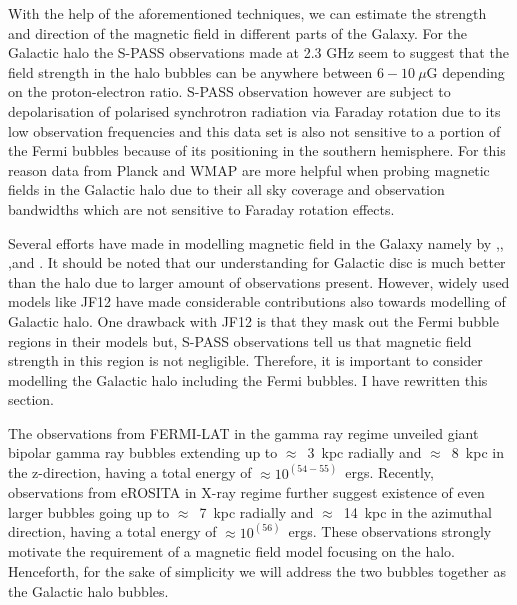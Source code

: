 \documentclass[12pt, a4 paper]{article}
\newcommand{\Arjen}[1]{{\color{brown}#1}}
\newcommand{\Vasu}[1]{{\color{purple}#1}}
\begin{document}
With the help of the aforementioned techniques, we can estimate the strength and direction of the magnetic field in different parts of the Galaxy. 
For the Galactic halo the S-PASS observations made at 2.3 GHz seem to suggest that the field strength in the halo bubbles can be anywhere between $6-10~\mu $G depending on the proton-electron ratio. S-PASS observation however are subject to depolarisation of polarised synchrotron radiation via Faraday rotation due to its low observation frequencies and this data set is also not sensitive to a portion of the Fermi bubbles because of its positioning in the southern hemisphere. For this reason data from Planck and WMAP are more helpful when probing magnetic fields in the Galactic halo due to their all sky coverage and observation bandwidths which are not sensitive to Faraday rotation effects.


Several efforts have made in modelling magnetic field in the Galaxy namely by \cite{Jaffe_2010},\cite{Jaffe_2011}, \cite{Sun},and \cite{JF12}. It should be noted that our understanding for Galactic disc is much better than the halo due to larger amount of observations present. However, widely used models like JF12 have made considerable contributions also towards modelling of Galactic halo. One drawback with JF12 is that they mask out the Fermi bubble regions in their models but, S-PASS observations tell us that magnetic field strength in this region is not negligible. Therefore, it is important to consider modelling the Galactic halo including the Fermi bubbles.
\Vasu{I have rewritten this section.}

The observations from FERMI-LAT \cite{Su_2010} in the gamma ray regime unveiled giant bipolar gamma ray bubbles extending up to $\approx$~3~kpc radially and $\approx$~8~kpc in the z-direction, having a total energy of $\approx 10^{(54-55)}$~ergs. Recently, observations from eROSITA in X-ray regime further suggest existence of even larger bubbles going up to  $\approx$~7~kpc radially and $\approx$~14~kpc in the azimuthal direction, having a total energy of $\approx 10^{(56)}$~ergs. These observations strongly motivate the requirement of a magnetic field model focusing on the halo. Henceforth, for the sake of simplicity we will address the two bubbles together as the Galactic halo bubbles.
\end{document}
